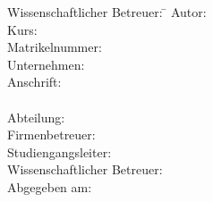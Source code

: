 \begin{titlepage}
\begin{center}
        \begin{minipage}{\textwidth}
            \begin{tabbing}
                Wissenschaftlicher Betreuer: \hspace{0.85cm}\=\kill
                Autor: \> \DerAutorDerArbeit \\[1mm]
                Kurs: \> \DieKursbezeichnung \\[1mm]
                Matrikelnummer: \> \DieMatrikelnummer \\[1mm]
                Unternehmen: \> \DerNameDerFirma  \\[1mm]
                Anschrift: \> \DieAnschrift  \\[1mm]
                \> \DiePLZ  \\[1mm]
                Abteilung: \> \DerNameDerAbteilung \\[1mm]
                Firmenbetreuer: \> \DerFirmenBetreuer \\[1mm]
                Studiengangsleiter: \> \DerStudiengangsleiter \\[1mm]
                Wissenschaftlicher Betreuer: \> \DerWissBetreuer \\[1mm]
                Abgegeben am: \> \DasAbgabedatum
            \end{tabbing}
        \end{minipage}
    \end{center}
\end{titlepage}
\newpage

